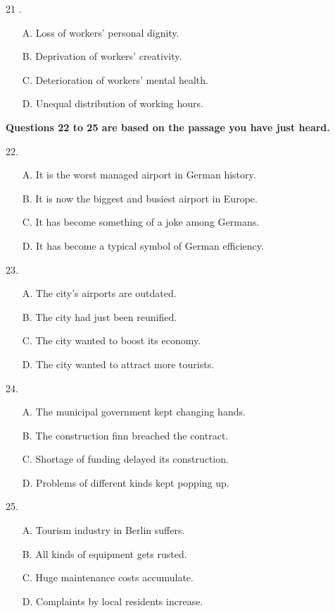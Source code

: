 \documentclass[UTF8,11pt]{ctexart}
\begin{document}
21 .


\begin{itemize}[leftmargin=2em,itemsep=.2em,topsep=.4em]\item[A.] Loss of workers' personal dignity.
\item[B.] Deprivation of workers' creativity.
\item[C.] Deterioration of workers' mental health.
\item[D.] Unequal distribution of working hours.
\end{itemize}

\textbf{Questions 22 to 25 are based on the passage you have just heard.}


22.


\begin{itemize}[leftmargin=2em,itemsep=.2em,topsep=.4em]\item[A.] It is the worst managed airport in German history.
\item[B.] It is now the biggest and busiest airport in Europe.
\item[C.] It has become something of a joke among Germans.
\item[D.] It has become a typical symbol of German efficiency.
\end{itemize}

23.


\begin{itemize}[leftmargin=2em,itemsep=.2em,topsep=.4em]\item[A.] The city's airports are outdated.
\item[B.] The city had just been reunified.
\item[C.] The city wanted to boost its economy.
\item[D.] The city wanted to attract more tourists.
\end{itemize}

24.


\begin{itemize}[leftmargin=2em,itemsep=.2em,topsep=.4em]\item[A.] The municipal government kept changing hands.
\item[B.] The construction finn breached the contract.
\item[C.] Shortage of funding delayed its construction.
\item[D.] Problems of different kinds kept popping up.
\end{itemize}

25.


\begin{itemize}[leftmargin=2em,itemsep=.2em,topsep=.4em]\item[A.] Tourism industry in Berlin suffers.
\item[B.] All kinds of equipment gets rusted.
\item[C.] Huge maintenance costs accumulate.
\item[D.] Complaints by local residents increase.
\end{itemize}
\end{document}
